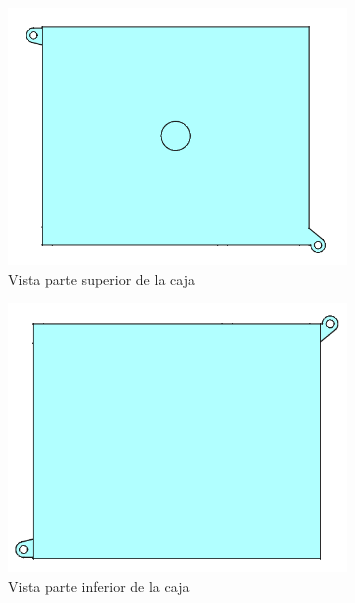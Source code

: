 \begin{figure}[H]
	\centering
	\includegraphics[width=0.8\textwidth]{images/4-DesarrolloTeorico/4-1-caja/CAJA_3D_ARRIBA.png}
	\caption{Vista parte superior de la caja}
\end{figure}

\begin{figure}[H]
	\centering
	\includegraphics[width=0.8\textwidth]{images/4-DesarrolloTeorico/4-1-caja/CAJA_3D_ABAJO.png}
	\caption{Vista parte inferior de la caja}
\end{figure}

